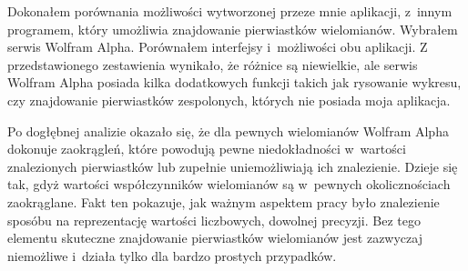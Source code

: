 Dokonałem porównania możliwości wytworzonej przeze mnie aplikacji, z~innym programem, który umożliwia znajdowanie pierwiastków wielomianów. Wybrałem serwis Wolfram Alpha. Porównałem interfejsy i~możliwości obu aplikacji. Z przedstawionego zestawienia wynikało, że różnice są niewielkie, ale serwis Wolfram Alpha posiada kilka dodatkowych funkcji takich jak rysowanie wykresu, czy znajdowanie pierwiastków zespolonych, których nie posiada moja aplikacja.

Po dogłębnej analizie okazało się, że dla pewnych wielomianów Wolfram Alpha dokonuje zaokrągleń, które powodują pewne niedokładności w~wartości znalezionych pierwiastków lub zupełnie uniemożliwiają ich znalezienie. Dzieje się tak, gdyż wartości współczynników wielomianów są w~pewnych okolicznościach zaokrąglane. Fakt ten pokazuje, jak ważnym aspektem pracy było znalezienie sposóbu na reprezentację wartości liczbowych, dowolnej precyzji. Bez tego elementu skuteczne znajdowanie pierwiastków wielomianów jest zazwyczaj niemożliwe i~działa tylko dla bardzo prostych przypadków.

